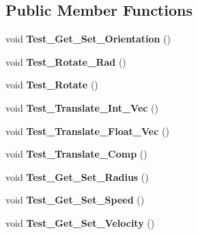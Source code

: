 \subsection*{Public Member Functions}
\begin{DoxyCompactItemize}
\item 
\hypertarget{classEntityTests_a4b80612f9df50c754b3ac3171e78755a}{void {\bfseries Test\-\_\-\-Get\-\_\-\-Set\-\_\-\-Orientation} ()}\label{classEntityTests_a4b80612f9df50c754b3ac3171e78755a}

\item 
\hypertarget{classEntityTests_aef1302b74489aa166bcdef3bad7b4715}{void {\bfseries Test\-\_\-\-Rotate\-\_\-\-Rad} ()}\label{classEntityTests_aef1302b74489aa166bcdef3bad7b4715}

\item 
\hypertarget{classEntityTests_a7ec5053f823a1161afe6cc7a60fdd86b}{void {\bfseries Test\-\_\-\-Rotate} ()}\label{classEntityTests_a7ec5053f823a1161afe6cc7a60fdd86b}

\item 
\hypertarget{classEntityTests_ad56e4efd080a454d757def1d9e7a4e1d}{void {\bfseries Test\-\_\-\-Translate\-\_\-\-Int\-\_\-\-Vec} ()}\label{classEntityTests_ad56e4efd080a454d757def1d9e7a4e1d}

\item 
\hypertarget{classEntityTests_a45140149055d3f6a9242ce0a30f20f73}{void {\bfseries Test\-\_\-\-Translate\-\_\-\-Float\-\_\-\-Vec} ()}\label{classEntityTests_a45140149055d3f6a9242ce0a30f20f73}

\item 
\hypertarget{classEntityTests_abd0c1ad16d97fe93f38136aff2b5f76e}{void {\bfseries Test\-\_\-\-Translate\-\_\-\-Comp} ()}\label{classEntityTests_abd0c1ad16d97fe93f38136aff2b5f76e}

\item 
\hypertarget{classEntityTests_a3d375bebf514f85133a01943356be591}{void {\bfseries Test\-\_\-\-Get\-\_\-\-Set\-\_\-\-Radius} ()}\label{classEntityTests_a3d375bebf514f85133a01943356be591}

\item 
\hypertarget{classEntityTests_a1d042a2454be85bb48cfc99a2302723d}{void {\bfseries Test\-\_\-\-Get\-\_\-\-Set\-\_\-\-Speed} ()}\label{classEntityTests_a1d042a2454be85bb48cfc99a2302723d}

\item 
\hypertarget{classEntityTests_a543d15f2b57a3e1d70de4e5f30d055d5}{void {\bfseries Test\-\_\-\-Get\-\_\-\-Set\-\_\-\-Velocity} ()}\label{classEntityTests_a543d15f2b57a3e1d70de4e5f30d055d5}


\end{DoxyCompactItemize}
